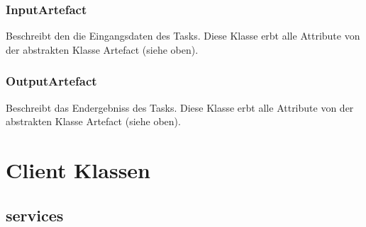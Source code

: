         \subsubsection{InputArtefact}
			Beschreibt den die Eingangsdaten des Tasks. \newline
			Diese Klasse erbt alle Attribute von der abstrakten Klasse Artefact (siehe oben).
			
        \subsubsection{OutputArtefact}
			Beschreibt das Endergebniss des Tasks. \newline
			Diese Klasse erbt alle Attribute von der abstrakten Klasse Artefact (siehe oben).
			
		

%            


%

\newpage

    \section{Client Klassen}
    
        \subsection{services}
        
